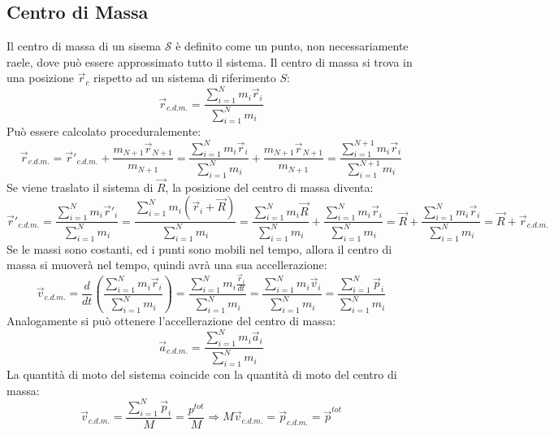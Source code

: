 \documentclass{article}
\numberwithin{equation}{subsection}
\begin{document}
\subsection{Centro di Massa}
Il centro di massa di un sisema $\mathscr{S}$ è definito come 
un punto, non necessariamente raele, dove può essere 
approssimato tutto il sistema. 
Il centro di massa si trova in una posizione $\vec{r}_c$ 
rispetto ad un sistema di riferimento $S$:
\begin{equation}
    \vec{r}_{c.d.m.}=\displaystyle\frac{\sum_{i=1}^{N}m_i\vec{r}_i}{\sum_{i=1}^{N}m_i}
\end{equation}
Può essere calcolato proceduralemente:
\begin{equation}
    \vec{r}_{c.d.m.}=\displaystyle\vec{r}'_{c.d.m.}+\frac{m_{N+1}\vec{r}_{N+1}}{m_{N+1}}=\frac{\sum_{i=1}^{N}m_i\vec{r}_i}{\sum_{i=1}^{N}m_i}+\frac{m_{N+1}\vec{r}_{N+1}}{m_{N+1}}=\frac{\sum_{i=1}^{N+1}m_i\vec{r}_i}{\sum_{i=1}^{N+1}m_i}
\end{equation}
Se viene traslato il sistema di $\vec{R}$, la posizione del 
centro di massa diventa:
\begin{equation}
    \vec{r}'_{c.d.m.}=\displaystyle\frac{\sum_{i=1}^{N}m_i\vec{r}'_i}{\sum_{i=1}^{N}m_i}=\displaystyle\frac{\sum_{i=1}^{N}m_i(\vec{r}_i+\vec{R})}{\sum_{i=1}^{N}m_i}=\displaystyle\frac{\sum_{i=1}^{N}m_i\vec{R}}{\sum_{i=1}^{N}m_i}+\displaystyle\frac{\sum_{i=1}^{N}m_i\vec{r}_i}{\sum_{i=1}^{N}m_i}=\vec{R}+\displaystyle\frac{\sum_{i=1}^{N}m_i\vec{r}_i}{\sum_{i=1}^{N}m_i}=\vec{R}+\vec{r}_{c.d.m.}
\end{equation}
Se le massi sono costanti, ed i punti sono mobili nel tempo, 
allora il centro di massa si muoverà nel tempo, quindi avrà 
una sua accellerazione:
\begin{equation}
    \vec{v}_{c.d.m.}=\frac{d}{dt}\left(\displaystyle\frac{\sum_{i=1}^{N}m_i\vec{r}_i}{\sum_{i=1}^{N}m_i}\right)=\displaystyle\frac{\sum_{i=1}^{N}m_i\displaystyle\frac{\vec{r}_i}{dt}}{\sum_{i=1}^{N}m_i}=\displaystyle\frac{\sum_{i=1}^{N}m_i\vec{v}_i}{\sum_{i=1}^{N}m_i}=\displaystyle\frac{\sum_{i=1}^{N}\vec{p}_i}{\sum_{i=1}^{N}m_i}
\end{equation}
Analogamente si può ottenere l'accellerazione del centro di 
massa:
\begin{equation}
    \vec{a}_{c.d.m.}=\displaystyle\frac{\sum_{i=1}^{N}m_i\vec{a}_i}{\sum_{i=1}^{N}m_i}
\end{equation}
La quantità di moto del sistema coincide con la quantità di 
moto del centro di massa: 
\begin{equation}
    \vec{v}_{c.d.m.}=\displaystyle\frac{\sum_{i=1}^{N}\vec{p}_i}{M}=\displaystyle\frac{p^{tot}}{M}\Rightarrow M\vec{v}_{c.d.m.}=\vec{p}_{c.d.m.}=\vec{p}^{tot}
\end{equation}
\end{document}
